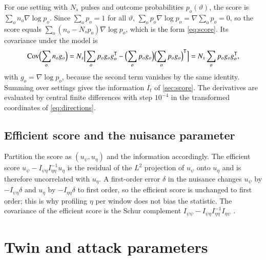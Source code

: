 For one setting with $N_s$ pulses and outcome probabilities $p_o(\vartheta)$, the score is $\sum_o n_o\nabla\log p_o$. Since $\sum_o p_o=1$ for all $\vartheta$, $\sum_o p_o\nabla\log p_o=\nabla\sum_o p_o=0$, so the score equals $\sum_o (n_o-N_sp_o)\nabla\log p_o$, which is the form \eqref{eq:score}. Its covariance under the model is
\begin{equation}
\mathrm{Cov}\Bigl(\sum_o n_o g_o\Bigr)=N_s\Bigl[\sum_o p_og_og_o^{\mathsf{T}}-\Bigl(\sum_o p_og_o\Bigr)\Bigl(\sum_o p_og_o\Bigr)^{\mathsf{T}}\Bigr]=N_s\sum_o p_og_og_o^{\mathsf{T}},
\end{equation}
with $g_o=\nabla\log p_o$, because the second term vanishes by the same identity. Summing over settings gives the information $I_t$ of \cref{sec:score}. The derivatives are evaluated by central finite differences with step $10^{-4}$ in the transformed coordinates of \cref{eq:directions}.

\subsection{Efficient score and the nuisance parameter}\label{app:efficient}

Partition the score as $(u_\psi,u_\eta)$ and the information accordingly. The efficient score $u_\psi-I_{\psi\eta}I_{\eta\eta}^{-1}u_\eta$ is the residual of the $L^2$ projection of $u_\psi$ onto $u_\eta$ and is therefore uncorrelated with $u_\eta$. A first-order error $\delta$ in the nuisance changes $u_\psi$ by $-I_{\psi\eta}\delta$ and $u_\eta$ by $-I_{\eta\eta}\delta$ to first order, so the efficient score is unchanged to first order; this is why profiling $\eta$ per window does not bias the statistic. The covariance of the efficient score is the Schur complement $I_{\psi\psi}-I_{\psi\eta}I_{\eta\eta}^{-1}I_{\eta\psi}$ \cite{Neyman1959,LehmannRomano2005}.

\section{Twin and attack parameters}\label{app:params}

